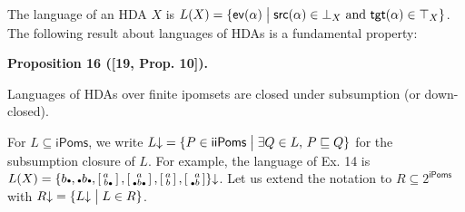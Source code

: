  
 
The language of an HDA $X$ is $L(X)={\{\mathsf{ev}(\alpha)\mathrel{\big{|}}\mathsf{src}(\alpha)\in\bot_{X}\text{ and }\mathsf{tgt}(\alpha)\in\top_{X}\}}$. The following result about languages of HDAs is a fundamental property:\par
 
 
 
\par\medskip\noindent\textbf{Proposition 16 ([19, Prop. 10]).}\par
 
 
Languages of HDAs over finite ipomsets are closed under subsumption (or down-closed).\par
 
 
 
 
For $L\subseteq\mathsf{iPoms}$, we write $L\mathord{\downarrow}={\{P\in\mathsf{iiPoms}\mathrel{\big{|}}\exists Q\in L,\,P\sqsubseteq Q\}}$ for the subsumption closure of $L$. For example, the language of Ex. 14 is $L(X)=\{b\vbox{\hbox{\tiny$\bullet$}},\vbox{\hbox{\tiny$\bullet$}}b\vbox{\hbox{\tiny$\bullet$}},\left[\begin{smallmatrix}a\hphantom{\vbox{\hbox{\tiny$\bullet$}}}\\
b\vbox{\hbox{\tiny$\bullet$}}\end{smallmatrix}\right],\left[\begin{smallmatrix}a\\
\vbox{\hbox{\tiny$\bullet$}}b\vbox{\hbox{\tiny$\bullet$}}\end{smallmatrix}\right],\left[\begin{smallmatrix}a\\
b\end{smallmatrix}\right],\left[\begin{smallmatrix}\hphantom{\vbox{\hbox{\tiny$\bullet$}}}a\\
\vbox{\hbox{\tiny$\bullet$}}b\end{smallmatrix}\right]\}\mathord{\downarrow}$. Let us extend the notation to $R\subseteq 2^{\mathsf{iPoms}}$ with $R\mathord{\downarrow}={\{L\mathord{\downarrow}\mathrel{\big{|}}L\in R\}}$.\par
 
